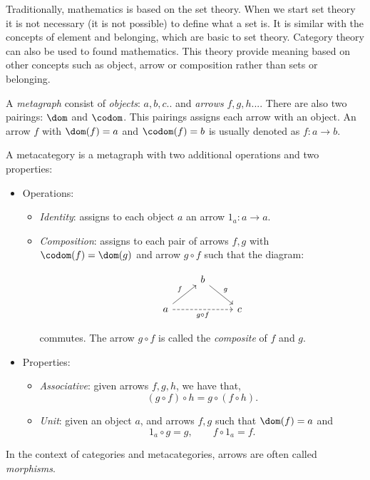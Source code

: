 Traditionally, mathematics is based on the set theory. When we start set theory it is not necessary (it is not possible) to define what a set is. It is similar with the concepts of element and belonging, which are basic to set theory. Category theory can also be used to found mathematics. This theory provide meaning based on other concepts such as object, arrow or composition rather than sets or belonging. \\

\begin{definition} \label{def:metagraph}
  A \emph{metagraph} consist of \emph{objects}: $a,b,c..$ and \emph{arrows} $f,g,h...$. There are also two pairings: $\dom$ and $\codom$. This pairings assigns each arrow with an object. An arrow $f$ with $\dom(f)=a$ and $\codom(f)=b$ is usually denoted as $f:a\to b$.\\
\end{definition}

\begin{definition}
  A metacategory  is a metagraph with two additional operations and two properties:
  \begin{itemize}
  \item Operations:
    \begin{itemize}
      
    \item \emph{Identity}: assigns to each object $a$ an arrow $1_a:a\to a$. 
    \item \emph{Composition}: assigns to each pair of arrows $f,g$ with $\codom(f)=\dom(g)$ and arrow $g\circ f$ such that the diagram:

      \[
        \begin{tikzcd}
          & b \arrow[rd, "g"]& \\
          a\arrow[ru, "f"] \arrow[rr, "g\circ f",swap, dashed] && c
        \end{tikzcd}
      \]

      commutes. The arrow $g\circ f$ is called the \emph{composite} of $f$  and $g$.
    \end{itemize}

  \item Properties:
    \begin{itemize}
    \item \emph{Associative}: given arrows $f,g,h$, we have that,
      $$(g\circ f) \circ h = g \circ (f \circ h).$$
    \item \emph{Unit}: given an object $a$, and arrows $f,g$ such that $\dom (f)= a$ and %
      $$1_a \circ g = g, \qquad f \circ 1_a = f.$$
    \end{itemize}
  \end{itemize}
  In the context of categories and metacategories, arrows are often called \emph{morphisms}.
\end{definition}

